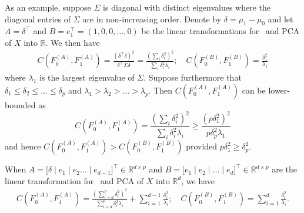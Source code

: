 \documentclass[10pt]{article}
\begin{document}
As an example, suppose $\Sigma$ is diagonal with distinct eigenvalues where the diagonal entries of $\Sigma$ are in non-increasing order.
Denote by $\delta = \mu_1 - \mu_0$ and let
$A = \delta^{\top}$ and $B = e_1^{\top} = (1,0,0,\dots,0)$ be the linear transformations for \Lol~and PCA of $X$ into $\mathbb{R}$. We then have
\begin{gather*}
C(F_0^{(A)}, F_1^{(A)}) = \frac{(\delta^{\top} \delta)^2}{\delta^{\top} \Sigma \delta} = \frac{(\sum_{i} \delta_i^{2})^{2}}{\sum_{i} \delta_i^{2} \lambda_i}; \quad
C(F_0^{(B)}, F_1^{(B)}) = \frac{\delta_1^2}{\lambda_1}
\end{gather*}
where $\lambda_1$ is the largest eigenvalue of $\Sigma$. Suppose furthermore that $\delta_1 \leq \delta_2 \leq \dots \leq \delta_p$ and $\lambda_1 > \lambda_2 > \dots > \lambda_p$. Then $C(F_0^{(A)}, F_1^{(A)})$ can be lower-bounded as
$$ C(F_0^{(A)}, F_1^{(A)}) = \frac{(\sum_{i} \delta_i^{2})^{2}}{\sum_{i} \delta_i^{2} \lambda_i} \geq \frac{(p \delta_1^2)^2}{p \delta_p^{2} \lambda_1} $$
and hence $C(F_0^{(A)}, F_1^{(A)}) > C(F_0^{(B)}, F_1^{(B)})$ provided $p \delta_1^{2}  \geq \delta_p^2$.

When $A = \bigl[ \delta \mid e_1 \mid e_2 \dots \mid e_{d-1} \bigr]^{\top} \in \mathbb{R}^{d \times p}$ and $B = \bigl[e_1 \mid e_2 \mid \dots \mid e_d \bigr]^{\top} \in \mathbb{R}^{d \times p}$ are the linear transformation for \Lol~and PCA of $X$ into $\mathbb{R}^{d}$, we have
\begin{gather*}
C(F_0^{(A)}, F_1^{(A)}) = \frac{(\sum_{i=d}^{p} \delta_i^2)^2}{\sum_{i=d}^{p} \delta_i^2 \lambda_i} + \sum_{i=1}^{d-1} \frac{\delta_i^{2}}{\lambda_i};  \quad
C(F_0^{(B)}, F_1^{(B)}) = \sum_{i=1}^{d} \frac{\delta_i^2}{\lambda_i}.
\end{gather*}
\end{document}
